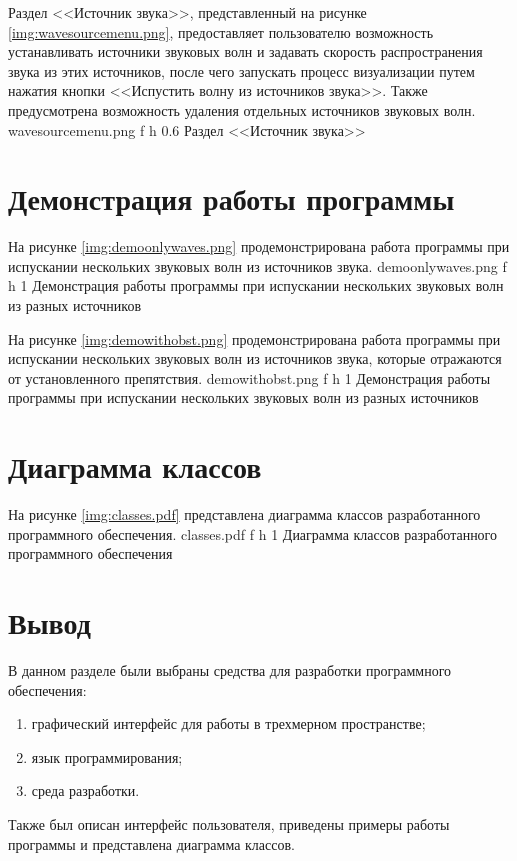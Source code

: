 \clearpage

Раздел <<Источник звука>>, представленный на рисунке \ref{img:wavesourcemenu.png}, предоставляет пользователю возможность устанавливать источники звуковых волн и задавать скорость распространения звука из этих источников, после чего запускать процесс визуализации путем нажатия кнопки <<Испустить волну из источников звука>>.
Также предусмотрена возможность удаления отдельных источников звуковых волн.
	{wavesourcemenu.png}
	{f}
	{h}
	{0.6\textwidth}
	{Раздел <<Источник звука>>}

\section{Демонстрация работы программы}

На рисунке \ref{img:demoonlywaves.png} продемонстрирована работа программы при испускании нескольких звуковых волн из источников звука.
	{demoonlywaves.png}
	{f}
	{h}
	{1\textwidth}
	{Демонстрация работы программы при испускании нескольких звуковых волн из разных источников}
	
\clearpage

На рисунке \ref{img:demowithobst.png} продемонстрирована работа программы при испускании нескольких звуковых волн из источников звука, которые отражаются от установленного препятствия.
	{demowithobst.png}
	{f}
	{h}
	{1\textwidth}
	{Демонстрация работы программы при испускании нескольких звуковых волн из разных источников}
	
\clearpage
	
\section{Диаграмма классов}

На рисунке \ref{img:classes.pdf} представлена диаграмма классов разработанного программного обеспечения.
	{classes.pdf}
	{f}
	{h}
	{1\textwidth}
	{Диаграмма классов разработанного программного обеспечения}

\section{Вывод}

В данном разделе были выбраны средства для разработки программного обеспечения:
\begin{enumerate}
	\item графический интерфейс для работы в трехмерном пространстве;
	\item язык программирования;
	\item среда разработки.
\end{enumerate}
Также был описан интерфейс пользователя, приведены примеры работы программы и представлена диаграмма классов.